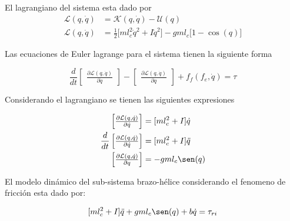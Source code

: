 \documentclass[a4paper]{IEEEtran} %
\begin{document}
El lagrangiano del sistema esta dado por
\begin{equation}
    \begin{split}
        \mathcal{L}(q,\dot{q})&=\mathcal{K}(q,\dot{q})-\mathcal{U}(q)\\
        \mathcal{L}(q,\dot{q})&=\frac{1}{2}\lbrack ml_c^2\dot q^2+I\dot{q}^2\rbrack-gml_c\lbrack1-\cos({q})\rbrack
    \end{split}
    \label{eq:lagrange}
\end{equation}

Las ecuaciones de Euler lagrange para el sistema tienen la siguiente forma

\begin{equation}
    \frac{d}{dt}\begin{bmatrix}
        \frac{\partial \mathcal{L}(q,\dot{q})}{\partial\dot{q}}
    \end{bmatrix}-\begin{bmatrix}
        \frac{\partial \mathcal{L}(q,\dot{q})}{\partial q}
    \end{bmatrix}+f_f(f_e,\dot{q})=\tau
    \label{eq:eu_lagran}
\end{equation}

Considerando el lagrangiano se tienen las siguientes expresiones

\begin{equation}
    \begin{split}
        \begin{bmatrix}
            \frac{\partial \mathcal{L}(q,\dot{q})}{\partial\dot{q}}
        \end{bmatrix}&=\lbrack ml_c^2+I\rbrack\dot{q}\\
        \frac{d}{dt}\begin{bmatrix}
            \frac{\partial\mathcal{L}(q,\dot{q})}{\partial\dot{q}}
        \end{bmatrix}&=\lbrack ml_c^2+I\rbrack\ddot{q}\\
        \begin{bmatrix}
            \frac{\partial \mathcal{L}(q,\dot{q})}{\partial q}
        \end{bmatrix}&=-gml_c\sen(q)\\
    \end{split}
    \label{eq:dq}
\end{equation}

El modelo dinámico del sub-sistema brazo-hélice considerando el fenomeno de fricción esta dado por:

\begin{equation}
    \lbrack ml_c^2+I\rbrack\ddot{q}+gml_c\sen(q)+b\dot{q}=\tau_{ri}
    \label{eq:din_model}
\end{equation}
\end{document}
